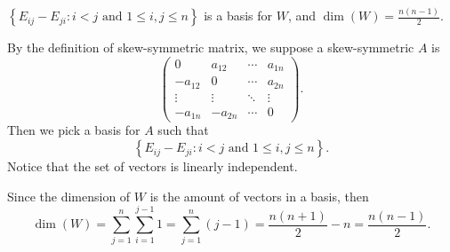 \begin{Exercise}
	\begin{answer}
		$\left\{ E_{i j} - E_{j i}: i<j\text{ and } 1\leq i,j\leq n\right\}$ is a basis for $W$, and $\dim(W) = \frac{n(n-1)}{2}$.
	\end{answer}
	\begin{solution}
		By the definition of skew-symmetric matrix, we suppose a skew-symmetric $A$ is
		$$
		\begin{pmatrix}
		0 & a_{1 2} & \cdots & a_{1 n} \\
		-a_{1 2} & 0 & \cdots & a_{2 n} \\
		\vdots & \vdots & \ddots & \vdots \\
		-a_{1 n} & -a_{2 n} & \cdots & 0
		\end{pmatrix}.
		$$
		Then we pick a basis for $A$ such that
		$$
		\left\{ E_{i j} - E_{j i}: i<j\text{ and } 1\leq i,j\leq n\right\}.
		$$
		Notice that the set of vectors is linearly independent.
		
		Since the dimension of $W$ is the amount of vectors in a basis, then
		$$
		\dim(W) = \sum_{j=1}^{n}\sum_{i=1}^{j-1} 1 = \sum_{j=1}^{n}(j-1) = \frac{n(n+1)}{2}-n = \frac{n(n-1)}{2}.
		$$
	\end{solution}
\end{Exercise}